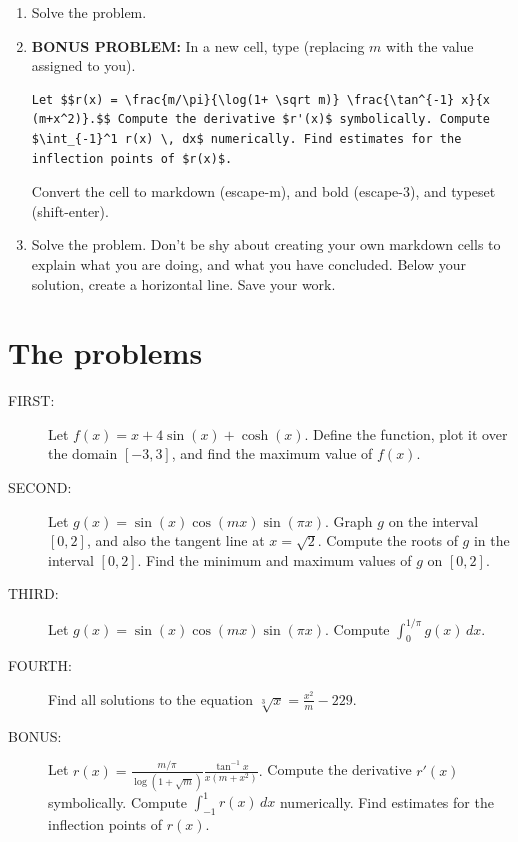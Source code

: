 \documentclass[12pt,answers]{book}
\begin{document}
\begin{enumerate}
  \item Solve the problem.

  \item {\bf BONUS PROBLEM:} In a new cell, type (replacing $m$ with the value assigned to you).
  \begin{lstlisting}[breaklines]
    Let $$r(x) = \frac{m/\pi}{\log(1+ \sqrt m)} \frac{\tan^{-1} x}{x (m+x^2)}.$$ Compute the derivative $r'(x)$ symbolically. Compute $\int_{-1}^1 r(x) \, dx$ numerically. Find estimates for the inflection points of $r(x)$.
  \end{lstlisting}
  Convert the cell to markdown (escape-m), and bold (escape-3), and typeset (shift-enter).
  \item Solve the problem. Don't be shy about creating your own markdown cells to explain what you are doing, and what you have concluded. Below your solution, create a horizontal line. Save your work.

\end{enumerate}

\section{The problems}
\begin{description}
  \item[FIRST:] Let $f(x) = x+4\sin(x)+\cosh(x)$. Define the function, plot it over the domain $[-3,3]$, and find the maximum value of $f(x)$.
  \item[SECOND:] Let $\displaystyle g(x) = \sin(x)\cos(m x)\sin(\pi x).$ Graph $g$ on the interval $[0,2]$, and also the tangent line at $x=\sqrt{2}$. Compute the roots of $g$ in the interval $[0,2]$. Find the minimum and maximum values of $g$ on $[0,2]$.
  \item[THIRD:] Let $g(x) = \sin(x)\cos(m x)\sin(\pi x)$. Compute $\int_0^{1/\pi} g(x)\,dx$.
  \item[FOURTH:] Find all solutions to the equation $\sqrt[3]{x} = \frac{x^2}{m} - 229$.
  \item[BONUS:] Let $\displaystyle r(x) = \frac{m/\pi}{\log(1+ \sqrt m)} \frac{\tan^{-1} x}{x (m+x^2)}.$ Compute the derivative $r'(x)$ symbolically. Compute $\int_{-1}^1 r(x) \, dx$ numerically. Find estimates for the inflection points of $r(x)$.
\end{description}
\end{document}
